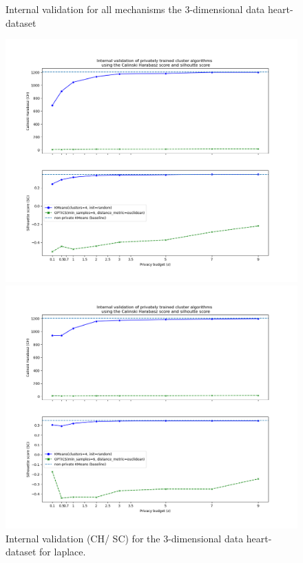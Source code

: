 \begin{figure}[H]
    \caption{Internal validation for all mechanisms the 3-dimensional data heart-dataset}
    \centering
    \begin{minipage}[c]{0.49\textwidth}
        \includegraphics[width=1\textwidth]{Results/3d-laplace/heart-dataset/ch-and-sc.png}
        \caption{Internal validation (CH/ SC) for the 3-dimensional data heart-dataset for laplace.}
        \label{fig:appendix-internal-validation-heart-dataset_comparison_3d-laplace}
    \end{minipage}
    \begin{minipage}[c]{0.49\textwidth}
        \includegraphics[width=1\textwidth]{Results/3d-laplace-truncated/heart-dataset/ch-and-sc.png}

\end{minipage}
\end{figure}
